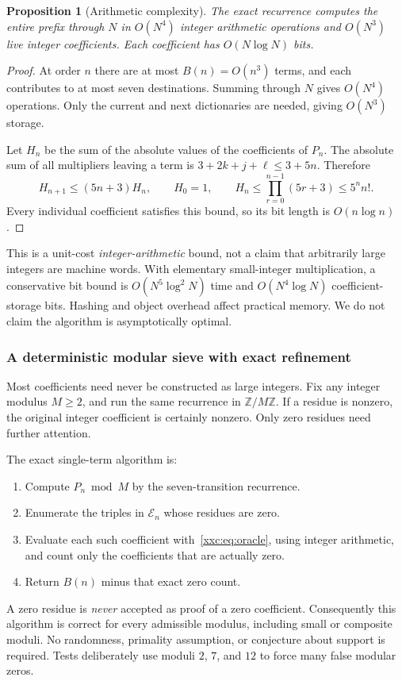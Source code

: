 \documentclass[11pt,a4paper]{article}
\numberwithin{equation}{section}
\newtheorem{proposition}[theorem]{Proposition}
\theoremstyle{definition}
\theoremstyle{remark}
\theoremstyle{plain}
\newcommand{\Z}{\mathbb Z}
\begin{document}
\begin{proposition}[Arithmetic complexity]\label{xxc:prop:complexity}
The exact recurrence computes the entire prefix through $N$ in $O(N^4)$
integer arithmetic operations and $O(N^3)$ live integer coefficients.
Each coefficient has $O(N\log N)$ bits.
\end{proposition}
\begin{proof}
At order $n$ there are at most $B(n)=O(n^3)$ terms, and each contributes to
at most seven destinations. Summing through $N$ gives $O(N^4)$ operations.
Only the current and next dictionaries are needed, giving $O(N^3)$ storage.

Let $H_n$ be the sum of the absolute values of the coefficients of $P_n$.
The absolute sum of all multipliers leaving a term is
$3+2k+j+\ell\le3+5n$. Therefore
\[
 H_{n+1}\le(5n+3)H_n,\qquad H_0=1,
 \qquad H_n\le\prod_{r=0}^{n-1}(5r+3)\le5^n n!.
\]
Every individual coefficient satisfies this bound, so its bit length is
$O(n\log n)$.
\end{proof}

This is a unit-cost \emph{integer-arithmetic} bound, not a claim that
arbitrarily large integers are machine words. With elementary small-integer
multiplication, a conservative bit bound is $O(N^5\log^2N)$ time and
$O(N^4\log N)$ coefficient-storage bits. Hashing and object overhead affect
practical memory. We do not claim the algorithm is asymptotically optimal.

\subsubsection{A deterministic modular sieve with exact refinement}

Most coefficients need never be constructed as large integers. Fix any
integer modulus $M\ge2$, and run the same recurrence in $\Z/M\Z$.
If a residue is nonzero, the original integer coefficient is certainly
nonzero. Only zero residues need further attention.

The exact single-term algorithm is:
\begin{enumerate}
\item Compute $P_n\bmod M$ by the seven-transition recurrence.
\item Enumerate the triples in $\mathcal E_n$ whose residues are zero.
\item Evaluate each such coefficient with~\eqref{xxc:eq:oracle}, using integer
      arithmetic, and count only the coefficients that are actually zero.
\item Return $B(n)$ minus that exact zero count.
\end{enumerate}
A zero residue is \emph{never} accepted as proof of a zero coefficient.
Consequently this algorithm is correct for every admissible modulus,
including small or composite moduli. No randomness, primality assumption,
or conjecture about support is required. Tests deliberately use moduli
$2$, $7$, and $12$ to force many false modular zeros.
\end{document}
